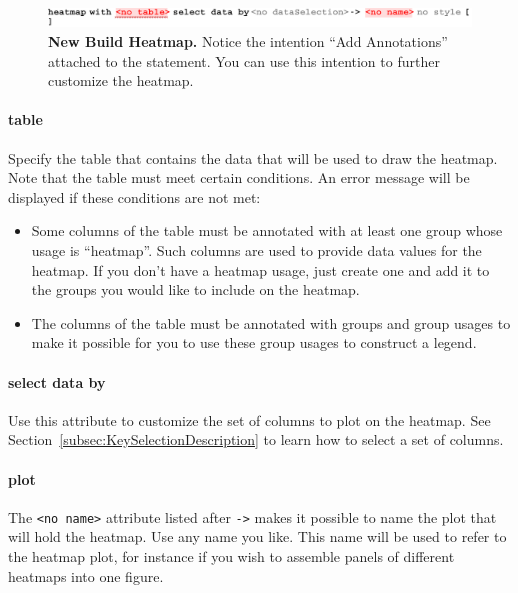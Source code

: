 \begin{figure}[h!tbp]
  \centering
  \includegraphics[width=\figWidthWide]{figures/NewBuildHeatmap.pdf}
\caption[New Heatmap.]{\textbf{New Build Heatmap.} Notice the intention ``Add Annotations'' attached to the statement. You can use this intention to further customize the heatmap.}
\label{fig:NewBuildHeatmap}
\end{figure}

\paragraph{table}
Specify the table that contains the data that will be used to draw the heatmap. Note that the table must meet certain conditions. An error message will be displayed if these conditions are not met:

\begin{itemize}
  \item Some columns of the table must be annotated with at least one group whose usage is ``heatmap''. Such columns are used to provide data values for the heatmap. If you don't have a heatmap usage, just create one and add it to the groups you would like to include on the heatmap.
  \item The columns of the table must be annotated with groups and group usages to make it possible for you to use these group usages to construct a legend.
\end{itemize}

\paragraph{select data by}
Use this attribute to customize the set of columns to plot on the heatmap. See Section~\ref{subsec:KeySelectionDescription} to learn how to select a set of columns.

\paragraph{plot}
The \texttt{<no name>} attribute listed after \texttt{->} makes it possible to name the plot that will hold the heatmap. Use any name you like. This name will be used to refer to the heatmap plot, for instance if you wish to assemble panels of different heatmaps into one figure.

